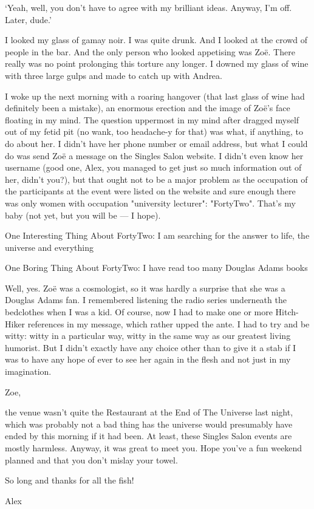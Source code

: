 `Yeah, well, you don't have to agree with my brilliant ideas.
Anyway, I'm off. Later, dude.'

I looked my glass of gamay noir. I was quite drunk. And I looked at
the crowd of people in the bar. And the only person who looked
appetising was Zo{\"e}. There really was no point prolonging this
torture any longer. I downed my glass of wine with three large gulps
and made to catch up with Andrea.

I woke up the next morning with a roaring hangover (that last glass
of wine had definitely been a mistake), an enormous erection and the
image of Zo{\"e}'s face floating in my mind. The question uppermost
in my mind after dragged myself out of my fetid pit (no wank, too
headache-y for {\twelveit that}) was what, if anything, to do about
her. I didn't have her phone number or email address, but what I
could do was send Zo{\"e} a message on the Singles Salon website. I
didn't even know her username (good one, Alex, you managed to get
just so much information out of her, didn't you?), but that ought
not to be a major problem as the occupation of the participants at
the event were listed on the website and sure enough there was only
women with occupation "university lecturer": "FortyTwo". That's my
baby (not yet, but you will be --- I hope).

One Interesting Thing About FortyTwo: I am searching for the answer
to life, the universe and everything

One Boring Thing About FortyTwo: I have read too many Douglas Adams
books

Well, yes. Zo{\"e} was a cosmologist, so it was hardly a surprise
that she was a Douglas Adams fan. I remembered listening the radio
series underneath the bedclothes when I was a kid. Of course, now I
had to make one or more {\twelvesl Hitch-Hiker\/} references in my
message, which rather upped the ante. I had to try and be witty:
witty in a particular way, witty in the same way as our greatest
living humorist. But I didn't exactly have any choice other than to
give it a stab if I was to have any hope of ever to see her again in
the flesh and not just in my imagination.

{\twelvett
Zoe,

the venue wasn't quite the Restaurant at the End of The Universe
last night, which was probably not a bad thing has the universe
would presumably have ended by this morning if it had been. At
least, these Singles Salon events are mostly harmless. Anyway, it
was great to meet you. Hope you've a fun weekend planned and that
you don't mislay your towel.

So long and thanks for all the fish!

Alex}

